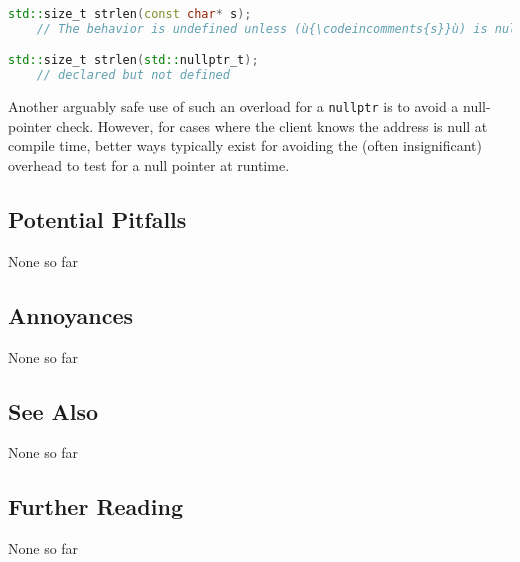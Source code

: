 \begin{lstlisting}[language=C++]
std::size_t strlen(const char* s);
    // The behavior is undefined unless (ù{\codeincomments{s}}ù) is null-terminated.

std::size_t strlen(std::nullptr_t);
    // declared but not defined 
\end{lstlisting}
    

\noindent Another arguably safe use of such an overload for a \texttt{nullptr} is
to avoid a null-pointer check. However, for cases where the client knows the address is null at compile time, better ways typically exist for avoiding the (often
insignificant) overhead to test for a null pointer at runtime.

\subsection[Potential Pitfalls]{Potential Pitfalls}\label{potential-pitfalls}

None so far

\subsection[Annoyances]{Annoyances}\label{annoyances}

None so far

\subsection[See Also]{See Also}\label{see-also}

None so far

\subsection[Further Reading]{Further Reading}\label{further-reading}

None so far

